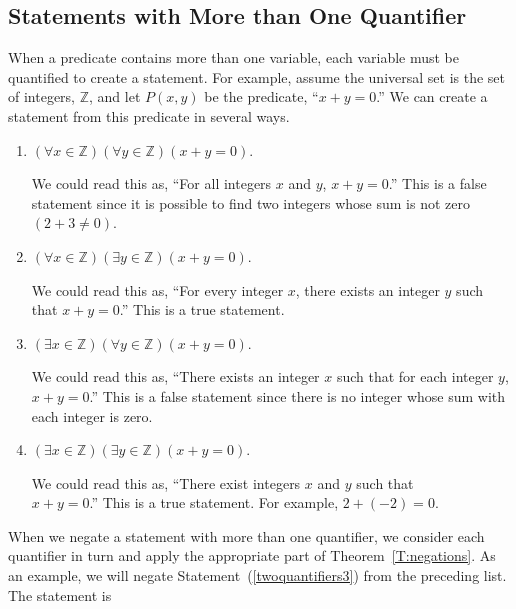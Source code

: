 
\subsection*{Statements with More than One Quantifier}
When a predicate contains more than one variable, each variable must be quantified to create a statement.  For example, assume the universal set is the set of integers, $\mathbb{Z}$, and let  $P\left( {x, y} \right)$ be the predicate, ``$x + y = 0$.''  We can create a statement from this predicate in several ways.
\begin{enumerate}
  \item $\left( {\forall x \in \mathbb{Z}} \right)\left( {\forall y \in \mathbb{Z}} \right)\left( {x + y = 0} \right)$. \label{twoquantifiers1}%

We could read this as, ``For all integers  $x$  and  $y$, $x + y = 0$.''  This is a false statement since it is possible to find two integers whose sum is not zero $\left( {2 + 3 \ne 0} \right)$.

  \item $\left( {\forall x \in \mathbb{Z}} \right)\left( {\exists y \in \mathbb{Z}} \right)\left( {x + y = 0} \right)$. \label{twoquantifiers2}%

We could read this as, ``For every integer  $x$, there exists an integer  $y$  such that 
$x + y = 0$.''  This is a true statement.

  \item $\left( {\exists x \in \mathbb{Z}} \right)\left( {\forall y \in \mathbb{Z}} \right)\left( {x + y = 0} \right)$. \label{twoquantifiers3}%

We could read this as, ``There exists an integer  $x$  such that for each integer   $y$, $x + y = 0$.''  This is a false statement since there is no integer  whose sum with each integer is zero.

  \item $\left( {\exists x \in \mathbb{Z}} \right)\left( {\exists y \in \mathbb{Z}} \right)\left( {x + y = 0} \right)$.

We could read this as, ``There exist integers  $x$  and  $y$  such that \\
$x + y = 0$.''  This is a true statement.  For example, $2 + \left( { - 2} \right) = 0$.  
\end{enumerate}
%
When we negate a statement with more than one quantifier, we consider each quantifier in turn and apply the appropriate part of Theorem~\ref{T:negations}.  As an example, we will negate Statement~(\ref{twoquantifiers3}) from the preceding list.  The statement is
